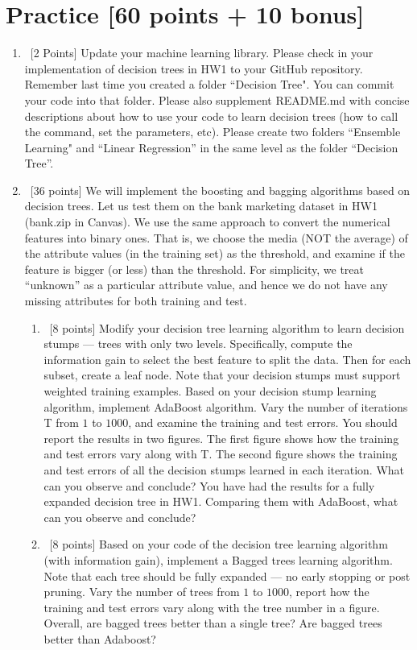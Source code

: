 \documentclass[12pt, fullpage,letterpaper]{article}
\begin{document}
\section{Practice [60 points + 10 bonus]}
\begin{enumerate}
	\item~[2 Points] Update your machine learning library. Please check in your implementation of decision trees in HW1 to your GitHub repository. Remember last time you created a folder ``Decision Tree". You can commit your code into that folder. Please also supplement README.md with concise descriptions about how to use your code to learn decision trees (how to call the command, set the parameters, etc). Please create two folders ``Ensemble Learning" and ``Linear Regression''  in the same level as the folder ``Decision Tree''.  


\item~[36 points] We will implement the boosting and bagging algorithms based on decision trees.  Let us test them on the bank marketing dataset in HW1 (bank.zip in Canvas). We use the same approach to convert the numerical features into binary ones. That is, we choose the media (NOT the average) of the attribute values (in the training set) as the threshold, and examine if the feature is bigger (or less) than the threshold.  For simplicity, we treat ``unknown'' as a particular attribute value, and hence we do not have any missing attributes for both training and test.
\begin{enumerate}
	\item~[8 points] Modify your decision tree learning algorithm to learn decision stumps ---  trees with only two levels. Specifically, compute the information gain to select the best feature to split the data. Then for each subset, create a leaf node. Note that your decision stumps must support weighted training examples. Based on your decision stump learning algorithm, implement AdaBoost algorithm. Vary the number of iterations T from $1$ to $1000$, and examine the training and test errors. You should report the results in two figures. The first figure shows how the training and test errors vary along with T. The second figure shows  the training and test errors of all the decision stumps learned in each iteration. What can you observe and conclude? You have had the results for a fully expanded decision tree in HW1. Comparing them with AdaBoost, what can you observe and conclude?
	
	\item~[8 points] Based on your code of the decision tree learning algorithm (with information gain), implement a Bagged trees learning algorithm. Note that each tree should be fully expanded --- no early stopping or post pruning. Vary the number of trees from $1$ to $1000$, report how the training and test errors vary along with the tree number in a figure. Overall, are bagged trees better than a single tree? Are bagged trees better than Adaboost? 
	

\end{enumerate}
\end{enumerate}
\end{document}
